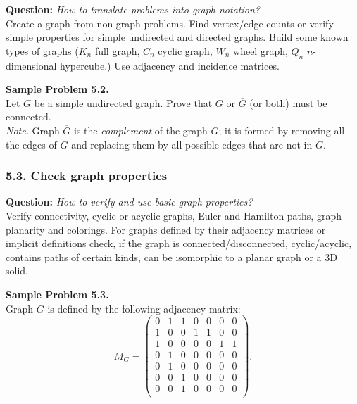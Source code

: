 \documentclass[jou]{apa6}
\begin{document}
{\bf Question:} {\em How to translate problems into graph notation?}\\
{\scriptsize 
Create a graph from non-graph problems. Find vertex/edge counts or verify 
simple properties for simple undirected and directed graphs. Build some known types of graphs 
($K_n$ \textendash{} full graph, $C_n$ \textendash{} cyclic graph, 
$W_n$ \textendash{} wheel graph, $Q_n$ \textendash{} $n$-dimensional hypercube.) 
Use adjacency and incidence matrices.
}






\vspace{6pt}
{\bf Sample Problem 5.2.}\\
Let $G$ be a simple undirected graph. Prove that $G$ or $\overline{G}$ (or both) must be connected.\\
{\em Note.} Graph $\overline{G}$ is the {\em complement} of the graph $G$; it is formed by removing all the edges of 
$G$ and replacing them by all possible edges that are not in $G$. 

\subsubsection{5.3. Check graph properties} 

{\bf Question:} {\em How to verify and use basic graph properties?}\\
{\scriptsize 
Verify connectivity, cyclic or acyclic graphs, Euler and Hamilton paths, 
graph planarity and colorings. For graphs defined by their adjacency matrices 
or implicit definitions check, if the graph is connected/disconnected, 
cyclic/acyclic, contains paths of certain kinds, 
can be isomorphic to a planar graph or a 3D solid. 
}


\vspace{6pt}
{\bf Sample Problem 5.3.}\\
Graph $G$ is defined by the following adjacency matrix:
$$M_G = \left(
\begin{array}{ccccccc}
0 & 1 & 1 & 0 & 0 & 0 & 0 \\
1 & 0 & 0 & 1 & 1 & 0 & 0 \\
1 & 0 & 0 & 0 & 0 & 1 & 1 \\
0 & 1 & 0 & 0 & 0 & 0 & 0 \\
0 & 1 & 0 & 0 & 0 & 0 & 0 \\
0 & 0 & 1 & 0 & 0 & 0 & 0 \\
0 & 0 & 1 & 0 & 0 & 0 & 0 \\
\end{array} \right).$$
\end{document}
